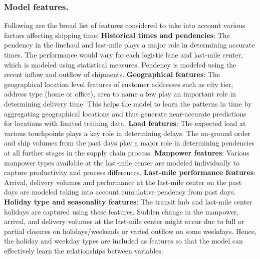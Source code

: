 \documentclass[twoside,leqno,twocolumn]{article}
\begin{document}
\subsubsection{Model features.}
Following are the broad list of features considered to take into account various factors affecting shipping time:
\vspace{0.1cm} \newline \textbf{Historical times and pendencies}: The pendency in the linehaul and last-mile plays a major role in determining accurate times. The performance would vary for each logistic lane and last-mile center, which is modeled using statistical measures. Pendency is modeled using the recent inflow and outflow of shipments.
\newline \textbf{Geographical features}: The geographical location level features of customer addresses such as city tier, address type (home or office), area to name a few play an important role in determining delivery time. This helps the model to learn the patterns in time by aggregating geographical locations and thus generate near-accurate predictions for locations with limited training data.
\newline \textbf{Load features}: The expected load at various touchpoints plays a key role in determining delays. The on-ground order and ship volumes from the past days play a major role in determining pendencies at all further stages in the supply chain process.
\newline \textbf{Manpower features}: Various manpower types available at the last-mile center are modeled individually to capture productivity and process differences.
\newline \textbf{Last-mile performance features}: Arrival, delivery volumes and performance at the last-mile center on the past days are modeled taking into account cumulative pendency from past days.
\newline \textbf{Holiday type and seasonality features}: The transit hub and last-mile center holidays are captured using these features. Sudden change in the manpower, arrival, and delivery volumes at the last-mile center might occur due to full or partial closures on holidays/weekends or varied outflow on some weekdays. Hence, the holiday and weekday types are included as features so that the model can effectively learn the relationships between variables.

\end{document}
